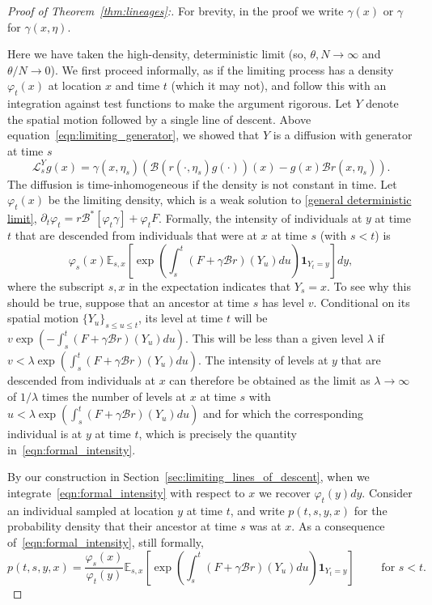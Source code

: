 \documentclass[EJP]{ejpecp} %
\newcommand{\IE}{\mathbb E}
\newcommand{\ind}{\mathbf{1}}
\newcommand{\DG}{\mathcal{B}}  %
\begin{document}
\begin{proof}[Proof of Theorem~\ref{thm:lineages}:]
For brevity, in the proof we write $\gamma(x)$ or $\gamma$ for $\gamma(x,\eta)$.

Here we have taken the high-density, deterministic limit
(so, $\theta, N \to \infty$ and $\theta/N \to 0$).
We first proceed informally,
as if the limiting process has a density $\varphi_t(x)$ at location $x$ and time $t$ (which it may not),
and follow this with an integration against test functions to make the argument rigorous.
Let $Y$ denote the spatial motion followed by a single line of descent.
Above equation~\eqref{eqn:limiting_generator},
we showed that $Y$ is a diffusion with generator at time $s$
$$
    \mathcal{L}^Y_s g(x) = \gamma(x,\eta_s) ( \DG(r(\cdot,\eta_s) g(\cdot))(x) - g(x) \DG r(x,\eta_s) ) .
$$
The diffusion is time-inhomogeneous if the density is not constant in time.
Let $\varphi_t(x)$ be the limiting density,
which is a weak solution to \eqref{general deterministic limit},
$\partial_t \varphi_t = r \DG^*[ \varphi_t \gamma ] + \varphi_t F$.
Formally, the intensity of individuals at $y$ at time $t$
that are descended from individuals that were at $x$ at time $s$
(with $s < t$) is
\begin{equation} \label{eqn:formal_intensity}
    \varphi_s(x) \IE_{s,x} \left[
        \exp\left(
            \int_s^t (F + \gamma \DG r)(Y_u) du
        \right)
        \ind_{Y_t = y}
    \right]
    dy ,
\end{equation}
where the subscript $s, x$ in the expectation indicates that $Y_s = x$.
To see why this should be true, 
suppose that an ancestor at time $s$ has level $v$. Conditional on its 
spatial motion $\{Y_u\}_{s\leq u\leq t}$, its level at time $t$ will
be $v \exp(-\int_s^t(F+\gamma\DG r)(Y_u)du)$. This will be less than a given level 
$\lambda$ if $v < \lambda \exp(\int_s^t(F+\gamma\DG r)(Y_u)du)$. 
The intensity of levels at $y$ that are descended from individuals at
$x$ can therefore be obtained as the limit as $\lambda\to\infty$ of 
$1/\lambda$ times the number of levels at $x$ at time $s$ with
$u<\lambda \exp(\int_s^t(F+\gamma\DG r)(Y_u)du)$ and for which
the corresponding individual is at $y$ at time $t$, which is 
precisely the quantity in~\eqref{eqn:formal_intensity}. 

By our construction in Section~\ref{sec:limiting_lines_of_descent},
when we integrate~\eqref{eqn:formal_intensity}
with respect to $x$ we recover $\varphi_t(y)dy$. 
Consider an individual sampled at location $y$ at time $t$,
and write $p(t,s,y,x)$ for the probability density
that their ancestor at time $s$ was at $x$.
As a consequence of~\eqref{eqn:formal_intensity},
still formally,
\begin{equation}
\label{eqn:ptsyx}
    p(t,s,y,x)
    =
    \frac{\varphi_s(x)}{\varphi_t(y)}
    \IE_{s,x}\left[
        \exp\left( \int_s^t (F + \gamma\DG r)(Y_u) du \right)
        \ind_{Y_t=y}
    \right]
\qquad \text{ for } s < t.
\end{equation}


\end{proof}
\end{document}
